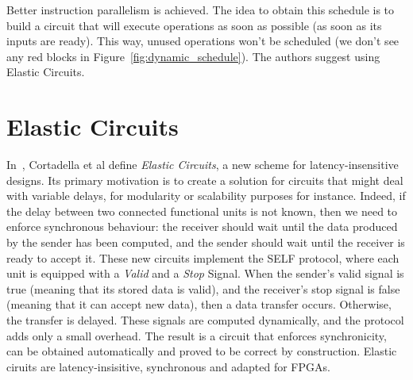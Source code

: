 \documentclass{article}
\begin{document}
Better instruction parallelism is achieved. The idea to obtain this schedule is to build a circuit that will execute operations as soon as possible (as soon as its inputs are ready). This way, unused operations won't be scheduled (we don't see any red blocks in Figure~\ref{fig:dynamic_schedule}). The authors suggest using Elastic Circuits.

\section{Elastic Circuits}

In~\cite{DBLP:conf/dac/CortadellaKG06}, Cortadella et al define \textit{Elastic Circuits}, a new scheme for latency-insensitive designs.
Its primary motivation is to create a solution for circuits that might deal with variable delays, for modularity or scalability purposes for instance.
Indeed, if the delay between two connected functional units is not known, then we need to enforce synchronous behaviour: the receiver should wait until the data produced by the sender has been computed, and the sender should wait until the receiver is ready to accept it.
These new circuits implement the SELF protocol, where each unit is equipped with a \textit{Valid} and a \textit{Stop} Signal. When the sender's valid signal is true (meaning that its stored data is valid), and the receiver's stop signal is false (meaning that it can accept new data), then a data transfer occurs. Otherwise, the transfer is delayed. These signals are computed dynamically, and the protocol adds only a small overhead. The result is a circuit that enforces synchronicity, can be obtained automatically and proved to be correct by construction. Elastic ciruits are latency-insisitive, synchronous and adapted for FPGAs.
\end{document}
